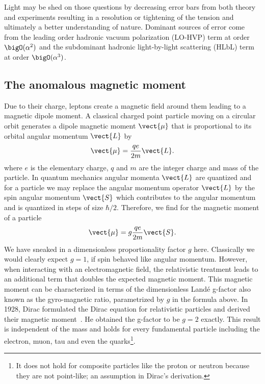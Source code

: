Light may be shed on those questions by decreasing error bars from both theory and experiments resulting in a resolution or tightening of the tension and ultimately a better understanding of nature.
Dominant sources of error come from the leading order hadronic vacuum polarization (LO-HVP) term at order $\bigO(\alpha^{2})$ and the subdominant hadronic light-by-light scattering (HLbL) term at order $\bigO(\alpha^{3})$.

\subsection{The anomalous magnetic moment}

Due to their charge, leptons create a magnetic field around them leading to a magnetic dipole moment.
A classical charged point particle moving on a circular orbit generates a dipole magnetic moment $\vect{\mu}$ that is proportional to its orbital angular momentum $\vect{L}$ by
\begin{equation}
\vect{\mu} = \frac{q e}{2 m} \vect{L}.
\end{equation}
where $e$ is the elementary charge, $q$ and $m$ are the integer charge and mass of the particle.
In quantum mechanics angular momenta $\vect{L}$ are quantized and for a \spinhalf particle we may replace the angular momentum operator $\vect{L}$ by the spin angular momentum $\vect{S}$ which contributes to the angular momentum and is quantized in steps of size $\hbar/2$.
Therefore, we find for the magnetic moment of a \spinhalf particle
\begin{equation}
\vect{\mu} = g \frac{q e}{2 m} \vect{S}.
\end{equation}
We have sneaked in a dimensionless proportionality factor $g$ here.
Classically we would clearly expect $g=1$, if spin behaved like angular momentum.
However, when interacting with an electromagnetic field, the relativistic treatment leads to an additional term that doubles the expected magnetic moment.
This magnetic moment can be characterized in terms of the dimensionless Landé g-factor also known as the gyro-magnetic ratio, parametrized by $g$ in the formula above.
In 1928, Dirac formulated the Dirac equation for relativistic \spinhalf particles and derived their magnetic moment~\cite{dirac1928quantum}.
He obtained the g-factor to be $g=2$ exactly.
This result is independent of the mass and holds for every fundamental \spinhalf particle including the electron, muon, tau and even the quarks\footnote{It does not hold for composite \spinhalf particles like the proton or neutron because they are not point-like; an assumption in Dirac's derivation.}.

